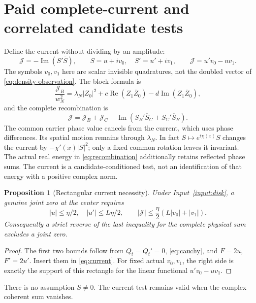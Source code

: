 \documentclass[11pt]{article}
\numberwithin{equation}{section}
\newtheorem{proposition}[theorem]{Proposition}
\theoremstyle{definition}
\theoremstyle{remark}
\DeclareMathOperator{\Rea}{Re}
\DeclareMathOperator{\Ima}{Im}
\newcommand{\JJ}{\mathcal J}
\begin{document}
\section{Paid complete-current and correlated candidate tests}
\label{sec:current}
Define the current without dividing by an amplitude:
\begin{equation}
 \JJ=-\Ima(S'\overline S),\qquad S=u+iv_0,\quad S'=u'+iv_1,
 \qquad\JJ=u'v_0-uv_1.
 \label{eq:current}
\end{equation}
The symbols $v_0,v_1$ here are scalar invisible quadratures, not the
doubled vector of \eqref{eq:density-observation}. The block formula is
\begin{equation}
 \frac{\JJ_B}{w_N^2}
 =\lambda_N|Z_0|^2+c\Rea(Z_1\overline Z_0)
                         -d\Ima(Z_1\overline Z_0),
 \label{eq:block-current}
\end{equation}
and the complete recombination is
\begin{equation}
 \JJ=\JJ_B+\JJ_C-\Ima(S_B'\overline S_C+S_C'\overline S_B).
 \label{eq:current-recombination}
\end{equation}
The common carrier phase value cancels from the current, which uses
phase differences. Its spatial motion remains through $\lambda_N$.
In fact $S\mapsto e^{i\chi(x)}S$ changes the current by
$-\chi'(x)|S|^2$; only a fixed common rotation leaves it invariant.
The actual real energy in \eqref{eq:recombination}
additionally retains reflected phase sums. The current is a
candidate-conditioned test, not an identification of that energy
with a positive complex norm.

\begin{proposition}[Rectangular current necessity]
\label{prop:current}
Under Input~\ref{input:disk}, a genuine joint zero at the center requires
\begin{equation}
 |u|\le\eta/2,\quad |u'|\le L\eta/2,\qquad
 |\JJ|\le\frac\eta2(L|v_0|+|v_1|).
 \label{eq:current-rect}
\end{equation}
Consequently a strict reverse of the last inequality for the complete
physical sum excludes a joint zero.
\end{proposition}
\begin{proof}
The first two bounds follow from $Q_t=Q_t'=0$, \eqref{eq:cauchy},
and $F=2u$, $F'=2u'$. Insert them in \eqref{eq:current}.
For fixed actual $v_0,v_1$, the right side is exactly the support of
this rectangle for the linear functional $u'v_0-uv_1$.
\end{proof}
There is no assumption $S\ne0$. The current test remains valid when
the complex coherent sum vanishes.
\end{document}
